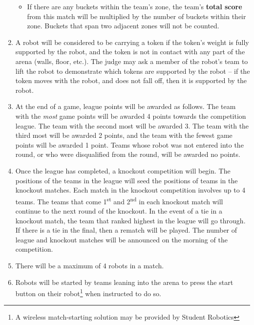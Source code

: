 \begin{enumerate}
\begin{itemize}
  \item If there are any buckets within the team's zone, the team's \textbf{total score} from this match will be multiplied by the number of buckets within their zone.
        Buckets that span two adjacent zones will not be counted.

\end{itemize}

\item A robot will be considered to be carrying a token if the token's weight is fully supported by the robot, and the token is not in contact with any part of the arena (walls, floor, etc.).
      The judge may ask a member of the robot's team to lift the robot to demonstrate which tokens are supported by the robot -- if the token moves with the robot, and does not fall off, then it is supported by the robot.

\item At the end of a game, league points will be awarded as follows.
      The team with the \emph{most} game points will be awarded 4 points towards the competition league.
      The team with the second most will be awarded 3.
      The team with the third most will be awarded 2 points, and the team with the fewest game points will be awarded 1 point.
      Teams whose robot was not entered into the round, or who were disqualified from the round, will be awarded no points.

\item Once the league has completed, a knockout competition will begin.
      The positions of the teams in the league will seed the positions of teams in the knockout matches.
      Each match in the knockout competition involves up to 4 teams.
      The teams that come 1\textsuperscript{st} and 2\textsuperscript{nd} in each knockout match will continue to the next round of the knockout.
      In the event of a tie in a knockout match, the team that ranked highest in the league will go through.
      If there is a tie in the final, then a rematch will be played.
      The number of league and knockout matches will be announced on the morning of the competition.

\item There will be a maximum of 4 robots in a match.
\item Robots will be started by teams leaning into the arena to press the start button on their robot\footnote{A wireless match-starting solution may be provided by Student Robotics} when instructed to do so.


\end{enumerate}
